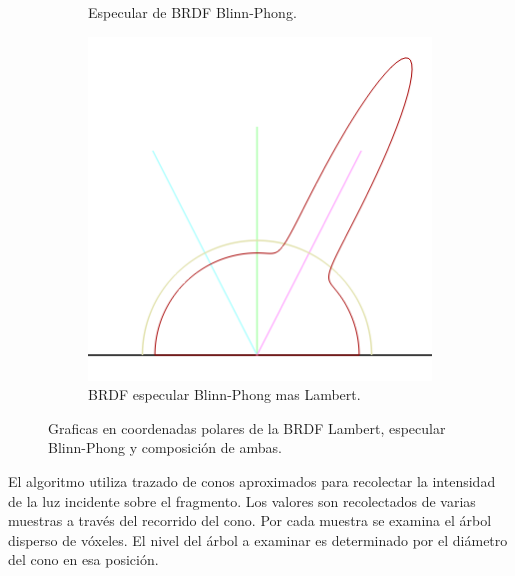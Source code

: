 \begin{figure}[H]
\begin{subfigure}[t]{.33\linewidth}
		\caption*{Especular de \ac{BRDF} Blinn-Phong.}
	\end{subfigure}\hfill
	\begin{subfigure}[t]{.33\linewidth}
		\centering
		\captionsetup{justification=centering}
		\includegraphics[width=\linewidth]{media/blinn_phong.png}
		\caption*{\ac{BRDF} especular Blinn-Phong mas Lambert.}
	\end{subfigure}
	\caption{Graficas en coordenadas polares de la BRDF Lambert, especular Blinn-Phong y composición de ambas.}
	\label{fig:brdf_cones}
\end{figure}

El algoritmo utiliza trazado de conos aproximados para recolectar la intensidad de la luz incidente sobre el fragmento. Los valores son recolectados de varias muestras a través del recorrido del cono. Por cada muestra se examina el árbol disperso de vóxeles. El nivel del árbol a examinar es determinado por el diámetro del cono en esa posición.

